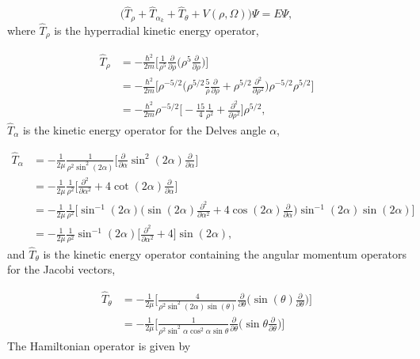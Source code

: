 \documentclass{article}
\numberwithin{equation}{section}
\begin{document}
\begin{equation}
\big(\hat{T}_{\rho} + \hat{T}_{\alpha_{k}} + \hat{T}_{\theta} + V(\rho,\Omega)\big) \Psi = E\Psi, 
\end{equation}
where $\hat{T}_{\rho}$ is the hyperradial kinetic energy operator,

\begin{align}
\hat{T}_{\rho} &= -\frac{\hbar^2}{2m} \Big[ \frac{1}{\rho^5}\frac{\partial}{\partial\rho} \Big( \rho^5 \frac{\partial}{\partial\rho} \Big)  \Big] \nonumber\\ 
&= -\frac{\hbar^2}{2m} \Big[ \rho^{-5/2} \Big( \rho^{5/2} \frac{5}{\rho} \frac{\partial}{\partial\rho} + \rho^{5/2} \frac{\partial^2}{\partial\rho^2} \Big) \rho^{-5/2} \rho^{5/2} \Big]\nonumber\\
&= -\frac{\hbar^2}{2m} \rho^{-5/2} \Big[  -\frac{15}{4} \frac{1}{\rho^2} + \frac{\partial^2}{\partial\rho^2} \Big] \rho^{5/2},
\end{align}
$\hat{T}_{\alpha}$ is the kinetic energy operator for the Delves angle $\alpha$,

\begin{align}
\hat{T}_{\alpha} &= -\frac{1}{2\mu}  \frac{1}{\rho^2 \sin^2(2\alpha)}  \bigg[ \frac{\partial}{\partial\alpha} \sin^2(2\alpha) \frac{\partial}{\partial\alpha} \bigg]\nonumber\\ 
&= -\frac{1}{2\mu} \frac{1}{\rho^2} \bigg[ \frac{\partial^2}{\partial\alpha^2} + 4\cot(2\alpha) \frac{\partial}{\partial\alpha} \bigg]\nonumber\\
&= -\frac{1}{2\mu} \frac{1}{\rho^2} \bigg[ \sin^{-1}(2\alpha) \bigg(\sin(2\alpha)\frac{\partial^2}{\partial\alpha^2} + 4\cos(2\alpha) \frac{\partial}{\partial\alpha} \bigg) \sin^{-1}(2\alpha) \sin(2\alpha) \bigg]\nonumber\\
&= -\frac{1}{2\mu} \frac{1}{\rho^2}\sin^{-1}(2\alpha) \bigg[ \frac{\partial^2}{\partial\alpha^2} + 4 \bigg] \sin(2\alpha),
\end{align} 
and $\hat{T}_{\theta}$ is the kinetic energy operator containing the angular momentum operators for the Jacobi vectors,

\begin{align}                  
\hat{T}_{\theta} &= -\frac{1}{2\mu} \bigg[ \frac{4}{\rho^2 \sin^2(2\alpha)\sin(\theta)} \frac{\partial}{\partial\theta} \bigg( \sin(\theta) \frac{\partial}{\partial\theta} \bigg) \bigg]\nonumber\\ 
                      	&= -\frac{1}{2\mu} \bigg[ \frac{1}{\rho^2 \sin^2\alpha\cos^2\alpha\sin\theta} \frac{\partial}{\partial\theta} \bigg( \sin\theta \frac{\partial}{\partial\theta} \bigg) \bigg]
\end{align}
The Hamiltonian operator is given by
\end{document}
